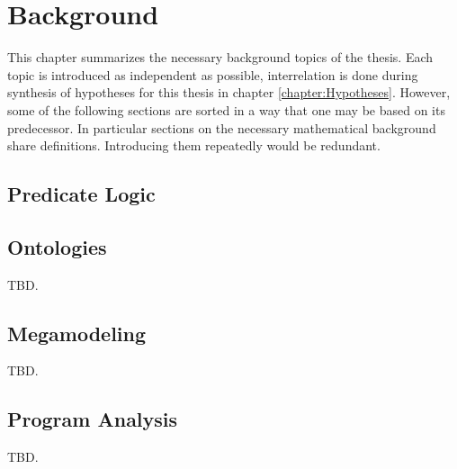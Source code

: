 \chapter{Background}
\label{chapter:Background}
This chapter summarizes the necessary background topics of the thesis.
Each topic is introduced as independent as possible, interrelation is done during synthesis of hypotheses for this thesis in chapter \ref{chapter:Hypotheses}.
However, some of the following sections are sorted in a way that one may be based on its predecessor.
In particular sections on the necessary mathematical background share definitions.
Introducing them repeatedly would be redundant.


\section{Predicate Logic}






\section{Ontologies}
TBD.
\cite{DBLP:series/ihis/GuarinoOS09}

\section{Megamodeling}
TBD.
\cite{DBLP:conf/sattose/BaggeZ14}
\cite{DBLP:journals/entcs/FavreN05}

\subsection{\megal}
\cite{DBLP:conf/ecmdafa/LammelV14}
\cite{DBLP:conf/models/FavreLV12}
\cite{DBLP:conf/sle/Lammel16}

\subsubsection{\megalxtext}
\cite{LukasHaertelBScThesis}




\section{Program Analysis}
TBD.

